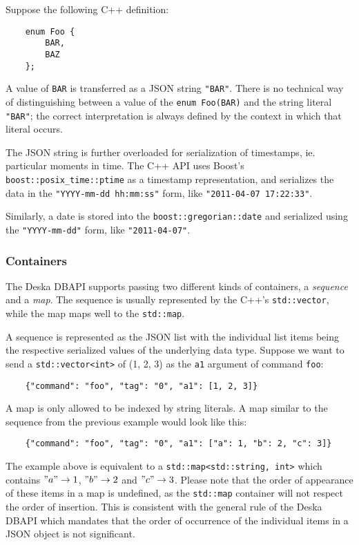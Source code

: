 \documentclass[deska]{subfiles}
\begin{document}
Suppose the following C++ definition:

\begin{verbatim}
    enum Foo {
        BAR,
        BAZ
    };
\end{verbatim}

A value of {\tt BAR} is transferred as a JSON string {\tt "BAR"}.  There is no technical way of distinguishing between
a value of the {\tt enum Foo(BAR)} and the string literal {\tt "BAR"}; the correct interpretation is always defined by
the context in which that literal occurs.

The JSON string is further overloaded for serialization of timestamps, ie. particular moments in time.  The C++ API uses
Boost's {\tt boost::posix\_time::ptime} as a timestamp representation, and serializes the data in the {\tt "YYYY-mm-dd
hh:mm:ss"} form, like {\tt "2011-04-07 17:22:33"}.

Similarly, a date is stored into the {\tt boost::gregorian::date} and serialized using the {\tt "YYYY-mm-dd"} form, like
{\tt "2011-04-07"}.

\subsubsection{Containers}

The Deska DBAPI supports passing two different kinds of containers, a {\em sequence} and a {\em map}.  The sequence is
usually represented by the C++'s {\tt std::vector}, while the map maps well to the {\tt std::map}.

A sequence is represented as the JSON list with the individual list items being the respective serialized values of the
underlying data type. Suppose we want to send a {\tt std::vector<int>} of (1, 2, 3) as the {\tt a1} argument of command
{\tt foo}:

\begin{verbatim}
    {"command": "foo", "tag": "0", "a1": [1, 2, 3]}
\end{verbatim}

A map is only allowed to be indexed by string literals. A map similar to the sequence from the previous example would
look like this:

\begin{verbatim}
    {"command": "foo", "tag": "0", "a1": ["a": 1, "b": 2, "c": 3]}
\end{verbatim}

The example above is equivalent to a {\tt std::map<std::string, int>} which contains $"a" \rightarrow 1$, $"b"
\rightarrow 2$ and $"c" \rightarrow 3$.  Please note that the order of appearance of these items in a map is undefined,
as the {\tt std::map} container will not respect the order of insertion.  This is consistent with the general rule of
the Deska DBAPI which mandates that the order of occurrence of the individual items in a JSON object is not significant.
\end{document}
